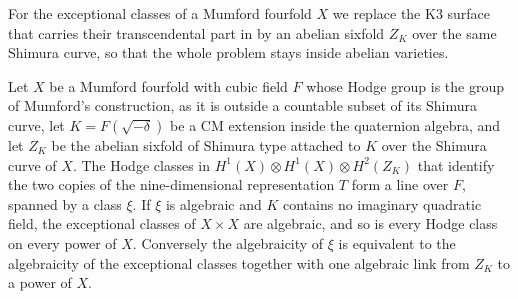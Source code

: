 For the exceptional classes of a Mumford fourfold $X$ we replace the K3 surface that carries their transcendental part in \cite{BMB26} by an abelian sixfold $Z_{K}$ over the same Shimura curve, so that the whole problem stays inside abelian varieties.

\begin{theorem}\label{thm:intro-link}
Let $X$ be a Mumford fourfold with cubic field $F$ whose Hodge group is the group of Mumford's construction, as it is outside a countable subset of its Shimura curve, let $K=F(\sqrt{-\delta})$ be a CM extension inside the quaternion algebra, and let $Z_{K}$ be the abelian sixfold of Shimura type attached to $K$ over the Shimura curve of $X$. The Hodge classes in $H^{1}(X)\otimes H^{1}(X)\otimes H^{2}(Z_{K})$ that identify the two copies of the nine-dimensional representation $T$ form a line over $F$, spanned by a class $\xi$. If $\xi$ is algebraic and $K$ contains no imaginary quadratic field, the exceptional classes of $X\times X$ are algebraic, and so is every Hodge class on every power of $X$. Conversely the algebraicity of $\xi$ is equivalent to the algebraicity of the exceptional classes together with one algebraic link from $Z_{K}$ to a power of $X$.
\end{theorem}

